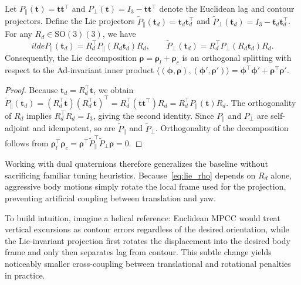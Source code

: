 \documentclass[letterpaper, 10pt, conference]{IEEEtran}
\newcommand{\SO}{\mathrm{SO}(3)}
\begin{document}
\begin{lemma}
Let $P_{\parallel}(\mathbf{t}) = \mathbf{t} \mathbf{t}^\top$ and $P_{\perp}(\mathbf{t}) = I_3 - \mathbf{t}\mathbf{t}^\top$ denote the Euclidean lag and contour projectors. Define the Lie projectors $\tilde{P}_{\parallel}(\mathbf{t}_d) = \mathbf{t}_d \mathbf{t}_d^\top$ and $\tilde{P}_{\perp}(\mathbf{t}_d) = I_3 - \mathbf{t}_d \mathbf{t}_d^\top$. For any $R_d \in \SO(3)$, we have
\begin{equation}
    	ilde{P}_{\parallel}(\mathbf{t}_d) = R_d^\top P_{\parallel}(R_d \mathbf{t}_d) R_d, \qquad \tilde{P}_{\perp}(\mathbf{t}_d) = R_d^\top P_{\perp}(R_d \mathbf{t}_d) R_d.
\end{equation}
Consequently, the Lie decomposition $\bm{\rho} = \bm{\rho}_l + \bm{\rho}_c$ is an orthogonal splitting with respect to the Ad-invariant inner product $\langle (\bm{\phi},\bm{\rho}),(\bm{\phi}',\bm{\rho}') \rangle = \bm{\phi}^\top \bm{\phi}' + \bm{\rho}^\top \bm{\rho}'$.
\end{lemma}

\begin{proof}
Because $\mathbf{t}_d = R_d^\top \mathbf{t}$, we obtain $\tilde{P}_{\parallel}(\mathbf{t}_d) = (R_d^\top \mathbf{t})(R_d^\top \mathbf{t})^\top = R_d^\top (\mathbf{t}\mathbf{t}^\top) R_d = R_d^\top P_{\parallel}(\mathbf{t}) R_d$. The orthogonality of $R_d$ implies $R_d^\top R_d = I_3$, giving the second identity. Since $P_{\parallel}$ and $P_{\perp}$ are self-adjoint and idempotent, so are $\tilde{P}_{\parallel}$ and $\tilde{P}_{\perp}$. Orthogonality of the decomposition follows from $\bm{\rho}_l^\top \bm{\rho}_c = \bm{\rho}^\top \tilde{P}_{\parallel}^\top \tilde{P}_{\perp} \bm{\rho} = 0$.
\end{proof}

Working with dual quaternions therefore generalizes the baseline without sacrificing familiar tuning heuristics. Because~\eqref{eq:lie_rho} depends on $R_d$ alone, aggressive body motions simply rotate the local frame used for the projection, preventing artificial coupling between translation and yaw.

To build intuition, imagine a helical reference: Euclidean MPCC would treat vertical excursions as contour errors regardless of the desired orientation, while the Lie-invariant projection first rotates the displacement into the desired body frame and only then separates lag from contour. This subtle change yields noticeably smaller cross-coupling between translational and rotational penalties in practice.
\end{document}
